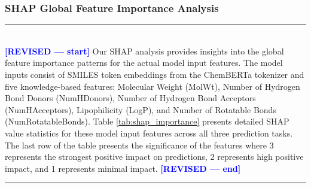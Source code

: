 \documentclass[preprint,12pt]{elsarticle}
\newcommand{\revisedstart}{\noindent\textcolor{blue}{\rule{\textwidth}{1pt}}\\\noindent\textcolor{blue}{\textbf{[REVISED --- start]}}\vspace{0.3em}}
\newcommand{\revisedend}{\vspace{0.3em}\noindent\textcolor{blue}{\textbf{[REVISED --- end]}}\\\noindent\textcolor{blue}{\rule{\textwidth}{1pt}}\vspace{0.5em}}
\begin{document}
\subsubsection*{SHAP Global Feature Importance Analysis}

\revisedstart
Our SHAP analysis provides insights into the global feature importance patterns for the actual model input features. The model inputs consist of SMILES token embeddings from the ChemBERTa tokenizer and five knowledge-based features: Molecular Weight (MolWt), Number of Hydrogen Bond Donors (NumHDonors), Number of Hydrogen Bond Acceptors (NumHAcceptors), Lipophilicity (LogP), and Number of Rotatable Bonds (NumRotatableBonds). Table \ref{tab:shap_importance} presents detailed SHAP value statistics for these model input features across all three prediction tasks. The last row of the table presents the significance of the features where 3 represents the strongest positive impact on predictions, 2 represents high positive impact, and 1 represents minimal impact.
\revisedend


\end{document}
